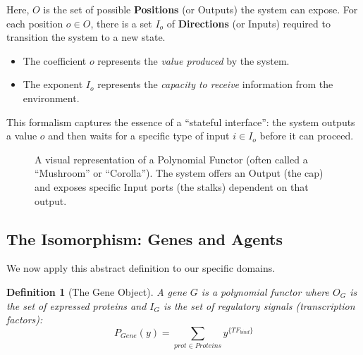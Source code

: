 \documentclass[11pt, a4paper]{article}
\newtheorem{definition}{Definition}
\begin{document}
Here, $O$ is the set of possible \textbf{Positions} (or Outputs) the system can expose. For each position $o \in O$, there is a set $I_o$ of \textbf{Directions} (or Inputs) required to transition the system to a new state.
\begin{itemize}
    \item The coefficient $o$ represents the \textit{value produced} by the system.
    \item The exponent $I_o$ represents the \textit{capacity to receive} information from the environment.
\end{itemize}
This formalism captures the essence of a ``stateful interface'': the system outputs a value $o$ and then waits for a specific type of input $i \in I_o$ before it can proceed.

\begin{figure}[h]
    \centering
    \caption{A visual representation of a Polynomial Functor (often called a ``Mushroom'' or ``Corolla''). The system offers an Output (the cap) and exposes specific Input ports (the stalks) dependent on that output.}
    \label{fig:poly_mushroom}
\end{figure}

\subsection{The Isomorphism: Genes and Agents}
We now apply this abstract definition to our specific domains.

\begin{definition}[The Gene Object]
A gene $G$ is a polynomial functor where $O_G$ is the set of expressed proteins and $I_G$ is the set of regulatory signals (transcription factors):
\begin{equation}
    P_{Gene}(y) = \sum_{prot \in Proteins} y^{\{TF_{bind}\}}
\end{equation}
\end{definition}
\end{document}
